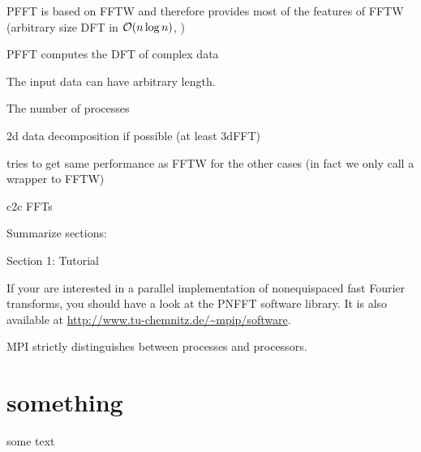 \begin{compactitem}
  \item PFFT is based on FFTW \cite{fftw} and therefore provides most of the features of FFTW
        (arbitrary size DFT in $\mathcal{O}(n \log n)$, )
  \item PFFT computes the DFT of complex data
  \item The input data can have arbitrary length.
  \item The number of processes 
\end{compactitem}


\begin{compactitem}
  \item 2d data decomposition if possible (at least 3dFFT)
  \item tries to get same performance as FFTW for the other cases (in fact we only call a wrapper to FFTW)
  \item c2c FFTs
\end{compactitem}

Summarize sections:
\begin{compactitem}
  \item Section 1: Tutorial
\end{compactitem}


If your are interested in a parallel implementation of nonequispaced fast Fourier
transforms, you should have a look at the PNFFT software library. It is also available
at \url{http://www.tu-chemnitz.de/~mpip/software}.


MPI strictly distinguishes between processes and processors. 

\section{something}
some text
